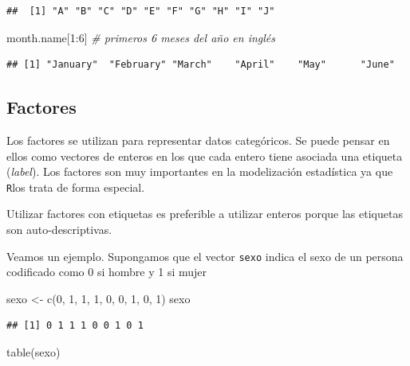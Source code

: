 \documentclass[
]{book}
\newenvironment{Shaded}{\begin{snugshade}}{\end{snugshade}}
\newcommand{\CommentTok}[1]{\textcolor[rgb]{0.56,0.35,0.01}{\textit{#1}}}
\newcommand{\DecValTok}[1]{\textcolor[rgb]{0.00,0.00,0.81}{#1}}
\newcommand{\FunctionTok}[1]{\textcolor[rgb]{0.00,0.00,0.00}{#1}}
\newcommand{\NormalTok}[1]{#1}
\newcommand{\OtherTok}[1]{\textcolor[rgb]{0.56,0.35,0.01}{#1}}
\newcommand{\SpecialCharTok}[1]{\textcolor[rgb]{0.00,0.00,0.00}{#1}}
\theoremstyle{break}
\theoremstyle{nonumberplain}
\begin{document}
\begin{verbatim}
##  [1] "A" "B" "C" "D" "E" "F" "G" "H" "I" "J"
\end{verbatim}

\begin{Shaded}
\begin{Highlighting}[]
\NormalTok{month.name[}\DecValTok{1}\SpecialCharTok{:}\DecValTok{6}\NormalTok{]  }\CommentTok{\# primeros 6 meses del año en inglés}
\end{Highlighting}
\end{Shaded}

\begin{verbatim}
## [1] "January"  "February" "March"    "April"    "May"      "June"
\end{verbatim}

\hypertarget{factores}{%
\subsection{Factores}\label{factores}}

Los factores se utilizan para representar datos categóricos.
Se puede pensar en ellos como vectores de enteros en los que cada entero tiene asociada una etiqueta (\emph{label}).
Los factores son muy importantes en la modelización estadística ya que \texttt{R}los trata de forma especial.

Utilizar factores con etiquetas es preferible a utilizar enteros porque las etiquetas son auto-descriptivas.

Veamos un ejemplo. Supongamos que el vector \texttt{sexo} indica el sexo de un persona codificado como 0 si hombre y 1 si mujer

\begin{Shaded}
\begin{Highlighting}[]
\NormalTok{sexo }\OtherTok{\textless{}{-}} \FunctionTok{c}\NormalTok{(}\DecValTok{0}\NormalTok{, }\DecValTok{1}\NormalTok{, }\DecValTok{1}\NormalTok{, }\DecValTok{1}\NormalTok{, }\DecValTok{0}\NormalTok{, }\DecValTok{0}\NormalTok{, }\DecValTok{1}\NormalTok{, }\DecValTok{0}\NormalTok{, }\DecValTok{1}\NormalTok{)}
\NormalTok{sexo}
\end{Highlighting}
\end{Shaded}

\begin{verbatim}
## [1] 0 1 1 1 0 0 1 0 1
\end{verbatim}

\begin{Shaded}
\begin{Highlighting}[]
\FunctionTok{table}\NormalTok{(sexo)}
\end{Highlighting}
\end{Shaded}
\end{document}
